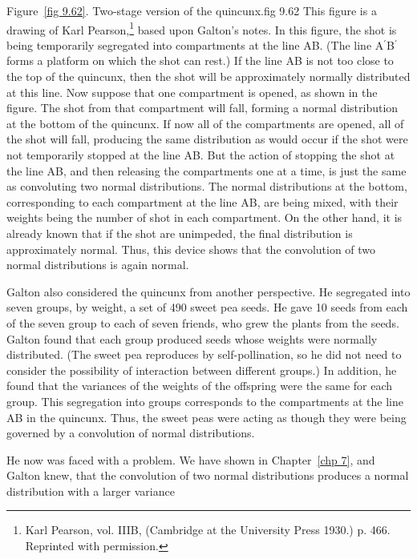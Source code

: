 Figure~\ref{fig 9.62}.  
{Two-stage version of the quincunx.}{fig 9.62}  
This figure is a drawing of Karl Pearson,\footnote{Karl Pearson,  vol. IIIB, (Cambridge at the University Press 1930.) p. 466.
Reprinted with permission.}
based upon Galton's notes.  In this figure, the shot is being temporarily segregated into compartments
at the line AB.   (The line A$^{\prime}$B$^{\prime}$ forms a platform on which the shot can
rest.)  If the line AB is not too close to the top of the quincunx, then the shot will be
approximately normally distributed at this line.  Now suppose that one compartment is opened,
as shown in the figure.  The shot from that compartment will fall, forming a normal
distribution at the bottom of the quincunx.  If now all of the compartments are opened, all of
the shot will fall, producing the same distribution as would occur if the shot were not
temporarily stopped at the line AB.  But the action of stopping the shot at the line AB, and
then releasing the compartments one at a time, is just the same as convoluting two normal
distributions.  The normal distributions at the bottom, corresponding to each compartment at
the line AB, are being mixed, with their weights being the number of shot in each
compartment.  On the other hand, it is already known that if the shot are unimpeded, the final
distribution is approximately normal.  Thus, this device shows that the convolution of two
normal distributions is again normal.
\par
Galton also considered the quincunx from another perspective.  He segregated into seven groups, by
weight, a set of 490 sweet pea seeds.  He gave 10 seeds from each of the seven group to each of
seven friends, who grew the plants from the seeds.  Galton found that each group
produced seeds whose weights were normally distributed.  (The sweet pea reproduces by
self-pollination, so he did not need to consider the possibility of interaction between different
groups.)  In addition, he found that the variances of the weights of the offspring were the same
for each group.  This segregation into groups corresponds to the compartments at the line AB in the
quincunx.  Thus, the sweet peas were acting as though they were being governed by a convolution of
normal distributions.  
\par
He now was faced with a problem.  We have shown in Chapter~\ref{chp 7}, and Galton knew, that the
convolution of two normal distributions produces a normal distribution with a larger variance

